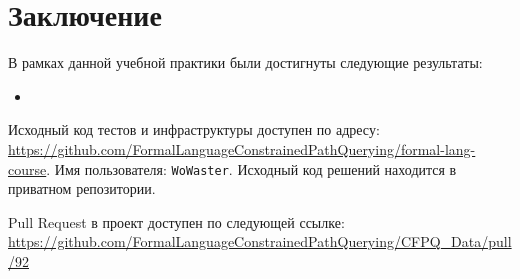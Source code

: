 
\section*{Заключение}
В рамках данной учебной практики были достигнуты следующие результаты:
\begin{itemize}
    \item {}
\end{itemize}

Исходный код тестов и инфраструктуры доступен по адресу: \url{https://github.com/FormalLanguageConstrainedPathQuerying/formal-lang-course}.
Имя пользователя: \texttt{WoWaster}.
Исходный код решений находится в приватном репозитории.

Pull Request в проект \cfpqdata{} доступен по следующей ссылке: \url{https://github.com/FormalLanguageConstrainedPathQuerying/CFPQ_Data/pull/92}
